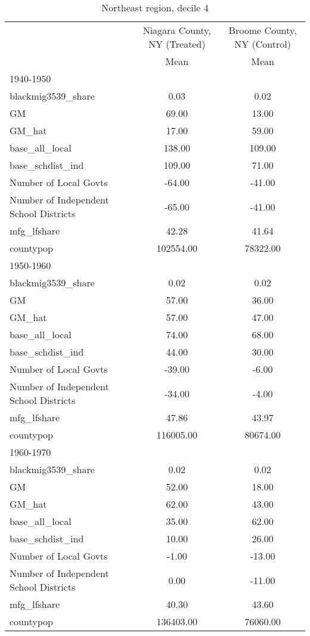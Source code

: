 \begin{table}[htbp]\centering
\def\sym#1{\ifmmode^{#1}\else\(^{#1}\)\fi}
\caption{Northeast region, decile 4 \label{tab1}}
\begin{tabular}{l*{2}{c}}
\toprule
                    &\multicolumn{1}{c}{Niagara County, NY (Treated)}&\multicolumn{1}{c}{Broome County, NY (Control)}\\
                    &        Mean&        Mean\\
\midrule
1940-1950           &            &            \\
blackmig3539\_share  &        0.03&        0.02\\
GM                  &       69.00&       13.00\\
GM\_hat              &       17.00&       59.00\\
base\_all\_local      &      138.00&      109.00\\
base\_schdist\_ind    &      109.00&       71.00\\
Number of Local Govts&      -64.00&      -41.00\\
Number of Independent School Districts&      -65.00&      -41.00\\
mfg\_lfshare         &       42.28&       41.64\\
countypop           &   102554.00&    78322.00\\
\midrule
1950-1960           &            &            \\
blackmig3539\_share  &        0.02&        0.02\\
GM                  &       57.00&       36.00\\
GM\_hat              &       57.00&       47.00\\
base\_all\_local      &       74.00&       68.00\\
base\_schdist\_ind    &       44.00&       30.00\\
Number of Local Govts&      -39.00&       -6.00\\
Number of Independent School Districts&      -34.00&       -4.00\\
mfg\_lfshare         &       47.86&       43.97\\
countypop           &   116005.00&    80674.00\\
\midrule
1960-1970           &            &            \\
blackmig3539\_share  &        0.02&        0.02\\
GM                  &       52.00&       18.00\\
GM\_hat              &       62.00&       43.00\\
base\_all\_local      &       35.00&       62.00\\
base\_schdist\_ind    &       10.00&       26.00\\
Number of Local Govts&       -1.00&      -13.00\\
Number of Independent School Districts&        0.00&      -11.00\\
mfg\_lfshare         &       40.30&       43.60\\
countypop           &   136403.00&    76060.00\\
\bottomrule
\end{tabular}
\end{table}

